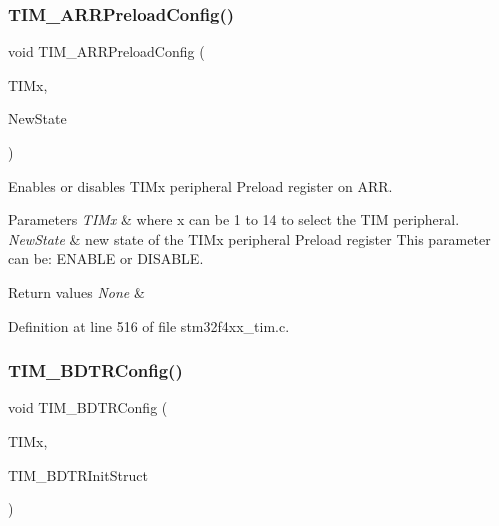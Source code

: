 \subsubsection{\texorpdfstring{T\+I\+M\+\_\+\+A\+R\+R\+Preload\+Config()}{TIM\_ARRPreloadConfig()}}
{\footnotesize\ttfamily void T\+I\+M\+\_\+\+A\+R\+R\+Preload\+Config (\begin{DoxyParamCaption}\item[{\hyperlink{struct_t_i_m___type_def}{T\+I\+M\+\_\+\+Type\+Def} $\ast$}]{T\+I\+Mx,  }\item[{Functional\+State}]{New\+State }\end{DoxyParamCaption})}



Enables or disables T\+I\+Mx peripheral Preload register on A\+RR. 


\begin{DoxyParams}{Parameters}
{\em T\+I\+Mx} & where x can be 1 to 14 to select the T\+IM peripheral. \\
\hline
{\em New\+State} & new state of the T\+I\+Mx peripheral Preload register This parameter can be\+: E\+N\+A\+B\+LE or D\+I\+S\+A\+B\+LE. \\
\hline
\end{DoxyParams}

\begin{DoxyRetVals}{Return values}
{\em None} & \\
\hline
\end{DoxyRetVals}


Definition at line 516 of file stm32f4xx\+\_\+tim.\+c.

\mbox{\label{group___t_i_m_ga3df4ba3f0727f63ce621e2b2e6035d4f}} 
\subsubsection{\texorpdfstring{T\+I\+M\+\_\+\+B\+D\+T\+R\+Config()}{TIM\_BDTRConfig()}}
{\footnotesize\ttfamily void T\+I\+M\+\_\+\+B\+D\+T\+R\+Config (\begin{DoxyParamCaption}\item[{\hyperlink{struct_t_i_m___type_def}{T\+I\+M\+\_\+\+Type\+Def} $\ast$}]{T\+I\+Mx,  }\item[{\hyperlink{struct_t_i_m___b_d_t_r_init_type_def}{T\+I\+M\+\_\+\+B\+D\+T\+R\+Init\+Type\+Def} $\ast$}]{T\+I\+M\+\_\+\+B\+D\+T\+R\+Init\+Struct }\end{DoxyParamCaption})}



